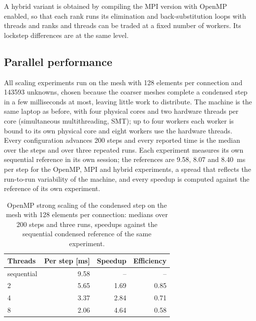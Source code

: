 \documentclass[11pt,a4paper]{article}
\begin{document}
A hybrid variant is obtained by compiling the MPI version with OpenMP
enabled, so that each rank runs its elimination and back-substitution loops
with threads and ranks and threads can be traded at a fixed number of
workers. Its lockstep differences are at the same level.

\subsection{Parallel performance}
\label{sec:scaling}

All scaling experiments run on the mesh with 128 elements per connection
and 143593 unknowns, chosen because the coarser meshes complete a condensed
step in a few milliseconds at most, leaving little work to distribute. The
machine is the same laptop as before, with four physical cores and two
hardware threads per core (simultaneous multithreading, SMT); up to four
workers each worker is bound to its own physical core and eight workers use
the hardware threads. Every configuration advances 200 steps and every
reported time is the median over the steps and over three repeated runs.
Each experiment measures its own sequential reference in its own session;
the references are 9.58, 8.07 and 8.40~ms per step for the OpenMP, MPI and
hybrid experiments, a spread that reflects the run-to-run variability of
the machine, and every speedup is computed against the reference of its own
experiment.

\begin{table}[htbp]
\centering
\begin{tabular}{lrrr}
\hline
Threads & Per step [ms] & Speedup & Efficiency \\
\hline
sequential & 9.58 & --   & --   \\
2          & 5.65 & 1.69 & 0.85 \\
4          & 3.37 & 2.84 & 0.71 \\
8          & 2.06 & 4.64 & 0.58 \\
\hline
\end{tabular}
\caption{\footnotesize OpenMP strong scaling of the condensed step on the
mesh with 128 elements per connection: medians over 200 steps and three
runs, speedups against the sequential condensed reference of the same
experiment.}
\label{tab:openmp}
\end{table}
\end{document}
